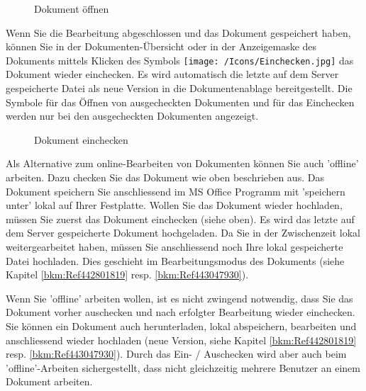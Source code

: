\begin{figure}[H]
\caption{Dokument öffnen}
\end{figure}

Wenn Sie die Bearbeitung abgeschlossen und das Dokument gespeichert haben, können Sie in der Dokumenten-Übersicht oder in der Anzeigemaske des
Dokuments mittels Klicken des Symbols \texttt{[image: /Icons/Einchecken.jpg]}  das Dokument wieder einchecken. Es wird automatisch die letzte auf dem Server gespeicherte Datei als neue Version in die Dokumentenablage bereitgestellt. Die Symbole für das Öffnen von ausgecheckten Dokumenten und für das Einchecken werden nur bei den ausgecheckten Dokumenten angezeigt.

\begin{figure}[H]
\caption{Dokument einchecken}
\end{figure}

Als Alternative zum online-Bearbeiten von Dokumenten können Sie auch 'offline' arbeiten. Dazu checken Sie das Dokument wie oben beschrieben aus. Das Dokument speichern Sie anschliessend im MS Office Programm mit 'speichern unter' lokal auf Ihrer Festplatte. Wollen Sie das Dokument wieder hochladen, müssen Sie
zuerst das Dokument einchecken (siehe oben). Es wird das letzte auf dem Server gespeicherte Dokument hochgeladen. Da Sie in der Zwischenzeit lokal weitergearbeitet haben, müssen Sie anschliessend noch Ihre lokal gespeicherte Datei hochladen. Dies geschieht im Bearbeitungsmodus des Dokuments (siehe Kapitel \ref{bkm:Ref442801819} resp. \ref{bkm:Ref443047930}). \newline

Wenn Sie 'offline' arbeiten wollen, ist es nicht zwingend notwendig, dass Sie das Dokument vorher auschecken und nach erfolgter Bearbeitung wieder einchecken. Sie können ein Dokument auch herunterladen, lokal abspeichern, bearbeiten und anschliessend wieder hochladen (neue Version, siehe Kapitel \ref{bkm:Ref442801819} resp. \ref{bkm:Ref443047930}). Durch das Ein- / Auschecken wird aber auch beim 'offline'-Arbeiten sichergestellt, dass nicht gleichzeitig mehrere Benutzer an einem Dokument arbeiten. 


